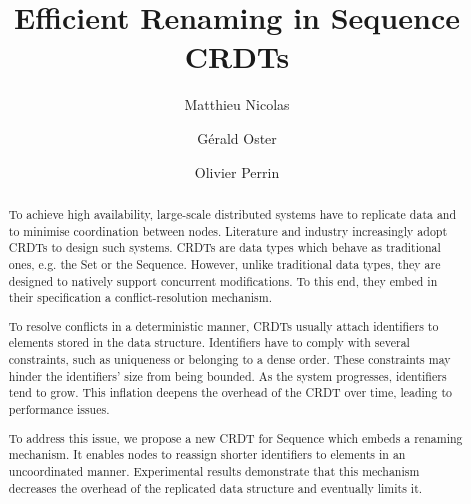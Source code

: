 \documentclass[sigplan,10pt,authorversion]{acmart}
\begin{document}
\title{Efficient Renaming in Sequence CRDTs}

\author{Matthieu Nicolas}

\author{Gérald Oster}

\author{Olivier Perrin}

\renewcommand\footnotetextcopyrightpermission[1]{} %
\pagestyle{plain} %


\begin{abstract}
To achieve high availability, large-scale distributed systems have to replicate data and to minimise coordination between nodes.
Literature and industry increasingly adopt \acfp{CRDT} to design such systems.
\acp{CRDT} are data types which behave as traditional ones, e.g. the Set or the Sequence.
However, unlike traditional data types, they are designed to natively support concurrent modifications.
To this end, they embed in their specification a conflict-resolution mechanism.

To resolve conflicts in a deterministic manner, \acp{CRDT} usually attach identifiers to elements stored in the data structure.
Identifiers have to comply with several constraints, such as uniqueness or belonging to a dense order.
These constraints may hinder the identifiers’ size from being bounded.
As the system progresses, identifiers tend to grow.
This inflation deepens the overhead of the \ac{CRDT} over time, leading to performance issues.

To address this issue, we propose a new CRDT for Sequence which embeds a renaming mechanism.
It enables nodes to reassign shorter identifiers to elements in an uncoordinated manner.
Experimental results demonstrate that this mechanism decreases the overhead of the replicated data structure and eventually limits it.
\end{abstract}
\end{document}

